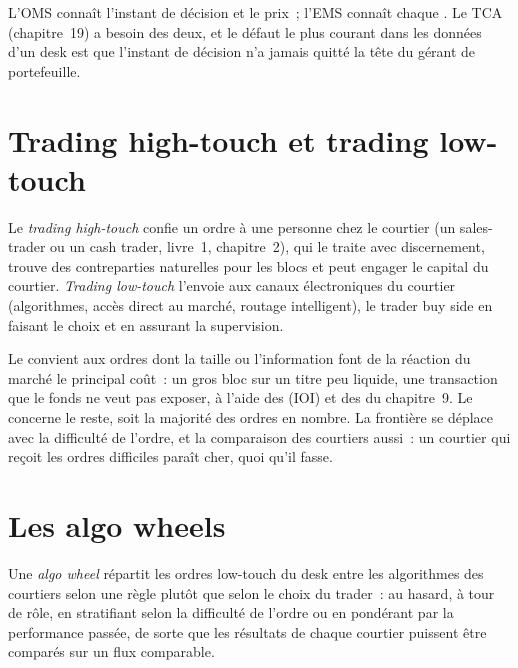 L'OMS connaît l'instant de décision et le prix~; l'EMS connaît chaque . Le TCA (chapitre~19) a besoin des deux, et le défaut le plus courant dans les données d'un desk est que
l'instant de décision n'a jamais quitté la tête du gérant de portefeuille.

\section{Trading high-touch et trading low-touch}

\begin{definition}\label{def:mx:the-buy-side-trading-desk-and-its-brokers:touch}
Le \emph{trading high-touch} confie un ordre à une personne chez le courtier (un sales-trader ou un cash trader, livre~1, chapitre~2),
qui le traite avec discernement, trouve des contreparties naturelles pour les blocs et peut engager le capital du courtier. \emph{Trading
low-touch} l'envoie aux canaux électroniques du courtier (algorithmes, accès direct au marché, routage intelligent), le trader
buy side en faisant le choix et en assurant la supervision.
\end{definition}

Le  convient aux ordres dont la taille ou l'information font de la réaction du marché le principal coût~: un gros bloc sur un titre peu liquide, une transaction que le fonds
ne veut pas exposer, à l'aide des  (IOI) et des  du chapitre~9. Le  concerne le reste, soit la majorité des ordres en nombre. La frontière
se déplace avec la difficulté de l'ordre, et la comparaison des courtiers aussi~: un courtier qui reçoit les ordres difficiles paraît cher, quoi qu'il fasse.

\section{Les algo wheels}

\begin{definition}\label{def:mx:the-buy-side-trading-desk-and-its-brokers:wheel}
Une \emph{algo wheel} répartit les ordres low-touch du desk entre les algorithmes des courtiers selon une règle plutôt que selon le choix du trader~:
au hasard, à tour de rôle, en stratifiant selon la difficulté de l'ordre ou en pondérant par la performance passée, de sorte que les résultats de chaque courtier puissent être comparés sur
un flux comparable.
\end{definition}

